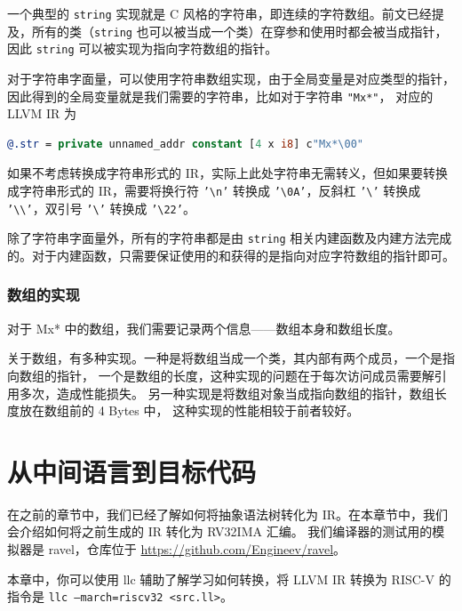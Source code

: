 一个典型的 \texttt{string} 实现就是 C 风格的字符串，即连续的字符数组。前文已经提及，所有的类（\texttt{string}
也可以被当成一个类）在穿参和使用时都会被当成指针，因此 \texttt{string}
可以被实现为指向字符数组的指针。

对于字符串字面量，可以使用字符串数组实现，由于全局变量是对应类型的指针，
因此得到的全局变量就是我们需要的字符串，比如对于字符串 \texttt{"Mx*"}，
对应的 LLVM IR 为
\begin{lstlisting}[language=llvm]
@.str = private unnamed_addr constant [4 x i8] c"Mx*\00"
\end{lstlisting}

如果不考虑转换成字符串形式的 IR，实际上此处字符串无需转义，但如果要转换成字符串形式的
IR，需要将换行符 \texttt{'\textbackslash{}n'} 转换成 \texttt{'\textbackslash{}0A'}，反斜杠
\texttt{'\textbackslash'} 转换成 \texttt{'\textbackslash\textbackslash'}，双引号
\texttt{'\textbackslash'} 转换成 \texttt{'\textbackslash22'}。

除了字符串字面量外，所有的字符串都是由 \texttt{string}
相关内建函数及内建方法完成的。对于内建函数，只需要保证使用的和获得的是指向对应字符数组的指针即可。

\subsubsection{数组的实现}\label{AST-to-IR-for-builtin-array}

对于 Mx* 中的数组，我们需要记录两个信息——数组本身和数组长度。

关于数组，有多种实现。一种是将数组当成一个类，其内部有两个成员，一个是指向数组的指针，
一个是数组的长度，这种实现的问题在于每次访问成员需要解引用多次，造成性能损失。
另一种实现是将数组对象当成指向数组的指针，数组长度放在数组前的 4 Bytes 中，
这种实现的性能相较于前者较好。

\section{从中间语言到目标代码}

在之前的章节中，我们已经了解如何将抽象语法树转化为
IR。在本章节中，我们会介绍如何将之前生成的 IR 转化为 RV32IMA 汇编。
我们编译器的测试用的模拟器是 ravel，仓库位于 \url{https://github.com/Engineev/ravel}。

\begin{remark}
本章中，你可以使用 llc 辅助了解学习如何转换，将 LLVM IR 转换为 RISC-V 的指令是
\texttt{llc --march=riscv32 <src.ll>}。
\end{remark}

